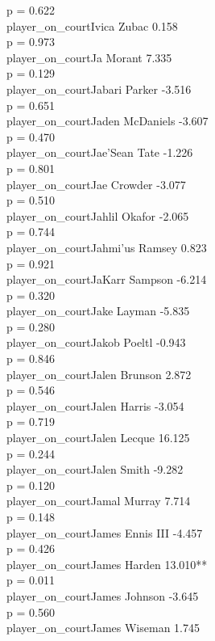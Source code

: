 \documentclass[
  landscape]{article}
\begin{document}
p = 0.622\\
player\_on\_courtIvica Zubac 0.158\\
p = 0.973\\
player\_on\_courtJa Morant 7.335\\
p = 0.129\\
player\_on\_courtJabari Parker -3.516\\
p = 0.651\\
player\_on\_courtJaden McDaniels -3.607\\
p = 0.470\\
player\_on\_courtJae'Sean Tate -1.226\\
p = 0.801\\
player\_on\_courtJae Crowder -3.077\\
p = 0.510\\
player\_on\_courtJahlil Okafor -2.065\\
p = 0.744\\
player\_on\_courtJahmi'us Ramsey 0.823\\
p = 0.921\\
player\_on\_courtJaKarr Sampson -6.214\\
p = 0.320\\
player\_on\_courtJake Layman -5.835\\
p = 0.280\\
player\_on\_courtJakob Poeltl -0.943\\
p = 0.846\\
player\_on\_courtJalen Brunson 2.872\\
p = 0.546\\
player\_on\_courtJalen Harris -3.054\\
p = 0.719\\
player\_on\_courtJalen Lecque 16.125\\
p = 0.244\\
player\_on\_courtJalen Smith -9.282\\
p = 0.120\\
player\_on\_courtJamal Murray 7.714\\
p = 0.148\\
player\_on\_courtJames Ennis III -4.457\\
p = 0.426\\
player\_on\_courtJames Harden 13.010**\\
p = 0.011\\
player\_on\_courtJames Johnson -3.645\\
p = 0.560\\
player\_on\_courtJames Wiseman 1.745\\
\end{document}
